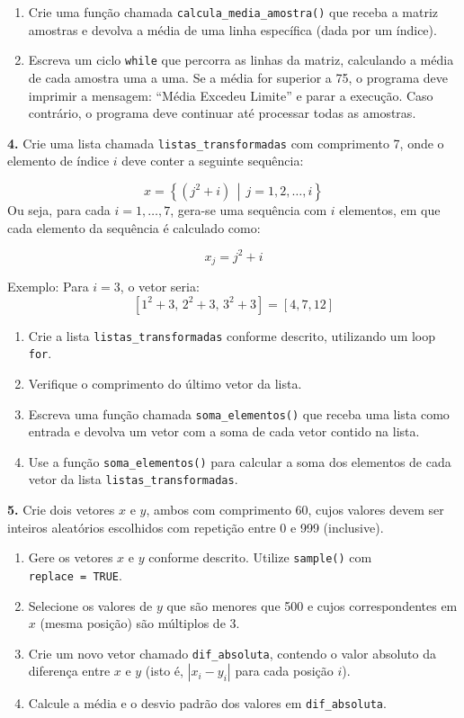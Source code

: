 \documentclass[
]{book}
\begin{document}
\begin{enumerate}
\def\labelenumi{(\alph{enumi})}
\item
  Crie uma função chamada \texttt{calcula\_media\_amostra()} que receba a matriz amostras e devolva a média de uma linha específica (dada por um índice).
\item
  Escreva um ciclo \texttt{while} que percorra as linhas da matriz, calculando a média de cada amostra uma a uma. Se a média for superior a 75, o programa deve imprimir a mensagem: ``Média Excedeu Limite'' e parar a execução. Caso contrário, o programa deve continuar até processar todas as amostras.
\end{enumerate}

\textbf{4.} Crie uma lista chamada \texttt{listas\_transformadas} com comprimento 7, onde o elemento de índice \(i\) deve conter a seguinte sequência:

\[x = \left\{ \left( j^2 + i \right) \,\middle|\, j = 1, 2, \dots, i \right\}\]
Ou seja, para cada \(i = 1, \dots, 7\), gera-se uma sequência com \(i\) elementos, em que cada elemento da sequência é calculado como:

\[x_j = j^2 + i\]

Exemplo: Para \(i = 3\), o vetor seria:
\[\left[ 1^2 + 3,\, 2^2 + 3,\, 3^2 + 3 \right] = [4, 7, 12]\]

\begin{enumerate}
\def\labelenumi{(\alph{enumi})}
\item
  Crie a lista \texttt{listas\_transformadas} conforme descrito, utilizando um loop \texttt{for}.
\item
  Verifique o comprimento do último vetor da lista.
\item
  Escreva uma função chamada \texttt{soma\_elementos()} que receba uma lista como entrada e devolva um vetor com a soma de cada vetor contido na lista.
\item
  Use a função \texttt{soma\_elementos()} para calcular a soma dos elementos de cada vetor da lista \texttt{listas\_transformadas}.
\end{enumerate}

\textbf{5.} Crie dois vetores \(x\) e \(y\), ambos com comprimento 60, cujos valores devem ser inteiros aleatórios escolhidos com repetição entre 0 e 999 (inclusive).

\begin{enumerate}
\def\labelenumi{(\alph{enumi})}
\item
  Gere os vetores \(x\) e \(y\) conforme descrito. Utilize \texttt{sample()} com \texttt{replace\ =\ TRUE}.
\item
  Selecione os valores de \(y\) que são menores que 500 e cujos correspondentes em \(x\) (mesma posição) são múltiplos de 3.
\item
  Crie um novo vetor chamado \texttt{dif\_absoluta}, contendo o valor absoluto da diferença entre \(x\) e \(y\) (isto é, \(|x_i - y_i|\) para cada posição \(i\)).
\item
  Calcule a média e o desvio padrão dos valores em \texttt{dif\_absoluta}.
\end{enumerate}
\end{document}
